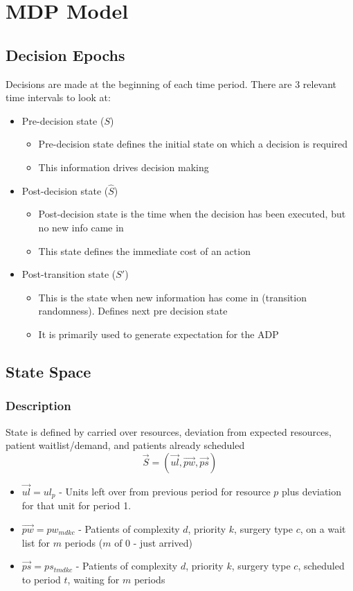 \section{MDP Model}

\subsection{Decision Epochs}
Decisions are made at the beginning of each time period. There are 3 relevant time intervals to look at:
\begin{itemize}
	\item Pre-decision state ($S$)
	\begin{itemize}
		\item Pre-decision state defines the initial state on which a decision is required
		\item This information drives decision making
	\end{itemize}
	
	\item Post-decision state ($\hat{S}$)
	\begin{itemize}
		\item Post-decision state is the time when the decision has been executed, but no new info came in
		\item This state defines the immediate cost of an action
	\end{itemize} 
	
	\item Post-transition state ($S'$)
	\begin{itemize}
		\item This is the state when new information has come in (transition randomness). Defines next pre decision state
		\item It is primarily used to generate expectation for the ADP
	\end{itemize}
\end{itemize}

\subsection{State Space}
\subsubsection{Description}
State is defined by carried over resources, deviation from expected resources, patient waitlist/demand, and patients already scheduled
\[  \vec{S}  = (\vec{ul}, \vec{pw}, \vec{ps}) \]
\begin{itemize}
	\item $\vec{ul} = ul_{p}$ - Units left over from previous period for resource $p$ plus deviation for that unit for period 1.
	\item $\vec{pw} = pw_{mdkc}$ - Patients of complexity $d$, priority $k$, surgery type $c$, on a wait list for $m$ periods ($m$ of 0 - just arrived)
	\item $\vec{ps} = ps_{tmdkc}$ - Patients of complexity $d$, priority $k$,  surgery type $c$, scheduled to period $t$, waiting for $m$ periods
\end{itemize}

